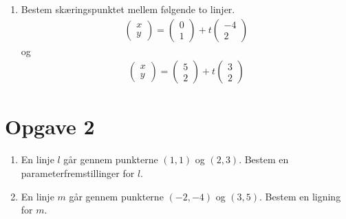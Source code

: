 \begin{enumerate}[label=\roman*)]
	\item Bestem skæringspunktet mellem følgende to linjer. 
	\begin{align*}
 		\begin{pmatrix}
 			x \\ y
 		\end{pmatrix}
 		=
 		\begin{pmatrix}
 			0 \\ 1
 		\end{pmatrix}
 		+
 		t
 		\begin{pmatrix}
 			-4 \\ 2
 		\end{pmatrix}
 	\end{align*}  
 	og
 	\begin{align*}
 		\begin{pmatrix}
 			 x \\ y
 		\end{pmatrix}
 		=
 		\begin{pmatrix}
 			5 \\ 2
 		\end{pmatrix}
 		+
 		t
 		\begin{pmatrix}
 			3 \\ 2
 		\end{pmatrix}
 	\end{align*}
 	
 	
\end{enumerate}

\section*{Opgave 2}
\begin{enumerate}[label=\roman*)]
	\item En linje $l$ går gennem punkterne $(1,1)$ og $(2,3)$. Bestem en parameterfremstillinger for 
	$l$. 
	\item En linje $m$ går gennem punkterne $(-2,-4)$ og $(3,5)$. Bestem en ligning for $m$. 
\end{enumerate}

